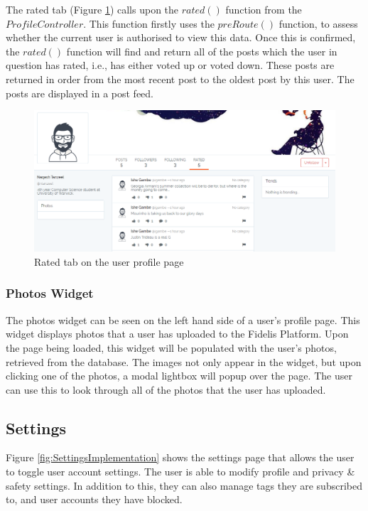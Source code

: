 The rated tab (Figure \ref{fig:ProfileRated}) calls upon the \(rated()\) function from the \(ProfileController\). This function firstly uses the \(preRoute()\) function, to assess whether the current user is authorised to view this data. Once this is confirmed, the \(rated()\) function will find and return all of the posts which the user in question has rated, i.e., has either voted up or voted down. These posts are returned in order from the most recent post to the oldest post by this user. The posts are displayed in a post feed.

\begin{figure}[H]
\centering
\includegraphics[width=\textwidth]{Images/Implementation/ProfileRated}
\caption{Rated tab on the user profile page}
\label{fig:ProfileRated}
\end{figure}

\subsubsection{Photos Widget}
The photos widget can be seen on the left hand side of a user's profile page. This widget displays photos that a user has uploaded to the Fidelis Platform. Upon the page being loaded, this widget will be populated with the user's photos, retrieved from the database. The images not only appear in the widget, but upon clicking one of the photos, a modal lightbox will popup over the page. The user can use this to look through all of the photos that the user has uploaded.

\subsection{Settings}
Figure \ref{fig:SettingsImplementation} shows the settings page that allows the user to toggle user account settings. The user is able to modify profile and privacy \& safety settings. In addition to this, they can also manage tags they are subscribed to, and user accounts they have blocked.

